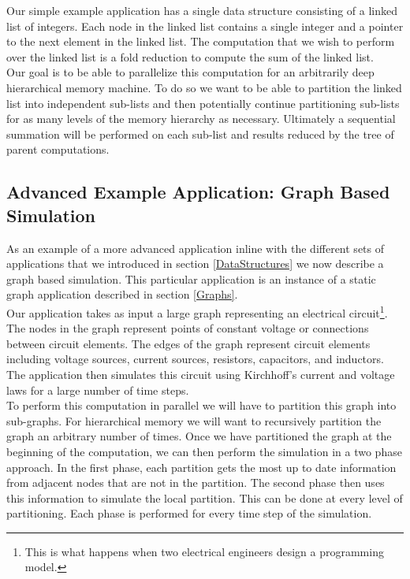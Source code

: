 \documentclass{article}
\theoremstyle{definition}
\begin{document}
\noindent
Our simple example application has a single data structure consisting of a
linked list of integers.  Each node in the linked list contains a single integer
and a pointer to the next element in the linked list.  The computation that
we wish to perform over the linked list is a fold reduction to compute the 
sum of the linked list. \\

\noindent
Our goal is to be able to parallelize this computation for an arbitrarily
deep hierarchical memory machine.  To do so we want to be able to 
partition the linked list into independent sub-lists and then potentially
continue partitioning sub-lists for as many levels of the memory hierarchy
as necessary.  Ultimately a sequential summation will be performed on
each sub-list and results reduced by the tree of parent computations.

\subsection{Advanced Example Application: Graph Based Simulation \label{GraphSim}}
\noindent
As an example of a more advanced application inline with the different sets
of applications that we introduced in section \ref{DataStructures} we now
describe a graph based simulation.  This particular application is an instance
of a static graph application described in section \ref{Graphs}. \\

\noindent
Our application takes as input a large graph representing an electrical
circuit\footnote{This is what happens when two electrical engineers
design a programming model.}.  The nodes in the graph represent points of
constant voltage or connections between circuit elements.  The edges of
the graph represent circuit elements including voltage sources, current
sources, resistors, capacitors, and inductors.  The application then
simulates this circuit using Kirchhoff's current and voltage laws for
a large number of time steps.\\

\noindent
To perform this computation in parallel we will have to partition this graph
into sub-graphs.  For hierarchical memory we will want to recursively partition
the graph an arbitrary number of times.  Once we have partitioned the graph at the beginning
of the computation, we can then perform the simulation in a two phase approach.
In the first phase, each partition gets the most up to date information from
adjacent nodes that are not in the partition.  The second phase then uses
this information to simulate the local partition.  This can be done at every
level of partitioning.  Each phase is performed for every time step
of the simulation.
\end{document}
